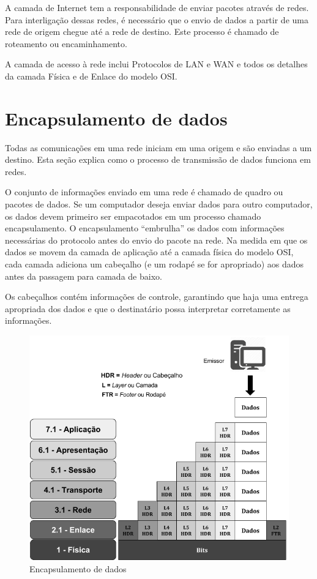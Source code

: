 \documentclass[
12pt,				%
openright,			%
oneside,			%
a4paper,			%
brazil,				%
]{abntex2}
\begin{document}
	\par A camada de Internet tem a responsabilidade de enviar pacotes através de redes. Para interligação dessas redes, é necessário que o envio de dados a partir de uma rede de origem chegue até a rede de destino. Este processo é chamado de roteamento ou encaminhamento.
	
	\par A camada de acesso à rede inclui Protocolos de LAN e WAN e todos os detalhes da camada Física e de Enlace do modelo OSI.
	
	\section{Encapsulamento de dados}
	
	\par Todas as comunicações em uma rede iniciam em uma origem e são enviadas a um destino. Esta seção explica como o processo de transmissão de dados funciona em redes.
	
	\par O conjunto de informações enviado em uma rede é chamado de quadro ou pacotes de dados. Se um computador deseja enviar dados para outro computador, os dados devem primeiro ser empacotados em um processo chamado encapsulamento. O encapsulamento “embrulha” os dados com informações necessárias do protocolo antes do envio do pacote na rede. Na medida em que os dados se movem da camada de aplicação até a camada física do modelo OSI, cada camada adiciona um cabeçalho (e um rodapé se for apropriado) aos dados antes da passagem para camada de baixo. 
	
	\par Os cabeçalhos contém informações de controle, garantindo que haja uma entrega apropriada dos dados e que o destinatário possa interpretar corretamente as informações.
	
	\begin{figure} [H]
		\centering
		\includegraphics[scale=.5]{figuras/cap2/03EncapsulamentoDedados}
		\caption{\label{fig_3}Encapsulamento de dados}
	\end{figure}	
	
\end{document}
